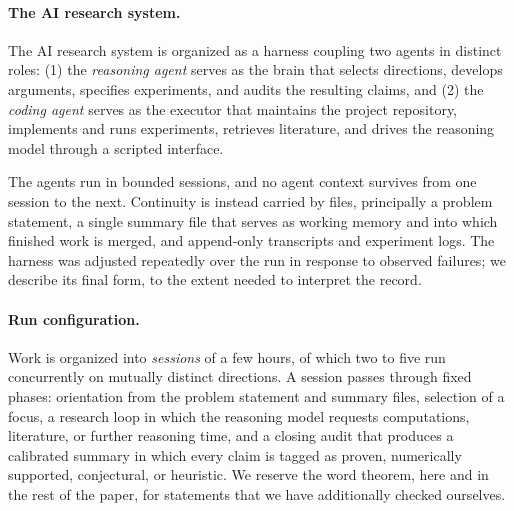 
\paragraph{The AI research system.}
The AI research system is organized as a harness coupling two agents in distinct roles: (1) the \textit{reasoning agent} serves as the brain that selects directions, develops arguments, specifies experiments, and audits the resulting claims, and (2) the \textit{coding agent} serves as the executor that maintains the project repository, implements and runs experiments, retrieves literature, and drives the reasoning model through a scripted interface.

The agents run in bounded sessions, and no agent context survives from one session to the next. Continuity is instead carried by files, principally a problem statement, a single summary file that serves as working memory and into which finished work is merged, and append-only transcripts and experiment logs. The harness was adjusted repeatedly over the run in response to observed failures; we describe its final form, to the extent needed to interpret the record.

\paragraph{Run configuration.}
Work is organized into \emph{sessions} of a few hours, of which two to
five run concurrently on mutually distinct directions. A session passes
through fixed phases: orientation from the problem statement and summary
files, selection of a focus, a research loop in which the reasoning model
requests computations, literature, or further reasoning time, and a
closing audit that produces a calibrated summary in which every claim is
tagged as proven, numerically supported, conjectural, or heuristic. We
reserve the word theorem, here and in the rest of the paper, for
statements that we have additionally checked ourselves.

